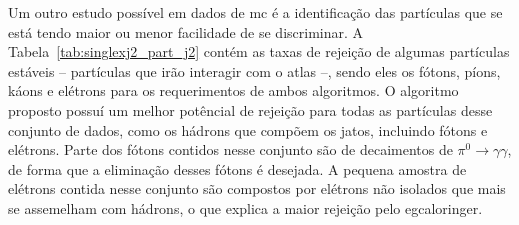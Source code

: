 Um outro estudo possível em dados de \gls{mc} é a identificação das partículas
que se está tendo maior ou menor facilidade de se discriminar. A
Tabela~\ref{tab:singlexj2_part_j2} contém as taxas de rejeição de algumas
partículas estáveis -- partículas que irão interagir com o \gls{atlas} --, sendo
eles os fótons, píons, káons e elétrons para os requerimentos de ambos
algoritmos. O algoritmo proposto possuí um melhor potêncial de rejeição para
todas as partículas desse conjunto de dados, como os hádrons que compõem os
jatos, incluindo fótons e elétrons. Parte dos fótons contidos nesse
conjunto são de decaimentos de $\pi^0\rightarrow\gamma\gamma$, de forma que a
eliminação desses fótons é desejada. A pequena amostra de elétrons contida nesse
conjunto são compostos por elétrons não isolados que mais se assemelham com
hádrons, o que explica a maior rejeição pelo \gls{egcaloringer}.

\begin{table}[htb]
\centering
{}
\caption{Rejeição de partículas estáveis para o conjunto de J2.}
\label{tab:singlexj2_part_j2}
\end{table}


